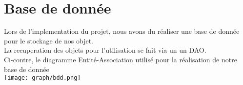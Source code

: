 \chapter{Base de donnée}
    Lors de l'implementation du projet, nous avons du réaliser une base de donnée pour le stockage de nos objet.\\
    La recuperation des objets pour l'utilisation se fait via un un DAO.\\

    Ci-contre, le diagramme Entité-Association utilisé pour la réalisation de notre base de donnée\\

	\texttt{[image: graph/bdd.png]}


